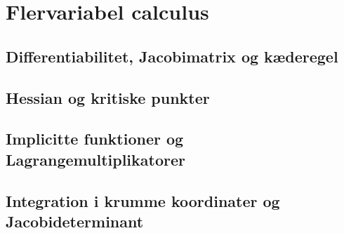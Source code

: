 \chapter{Flervariabel calculus}
\section{Differentiabilitet, Jacobimatrix og kæderegel}
\leavevmode\par

\section{Hessian og kritiske punkter}
\leavevmode\par

\section{Implicitte funktioner og Lagrangemultiplikatorer}
\leavevmode\par

\section{Integration i krumme koordinater og Jacobideterminant}
\leavevmode\par
